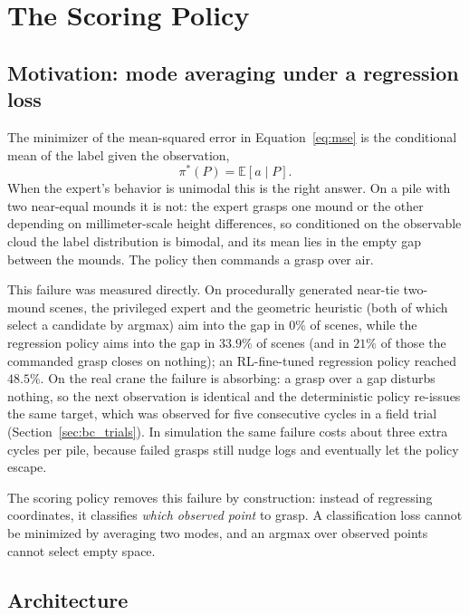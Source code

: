 \section{The Scoring Policy}
\label{sec:bc_scoring}

\subsection{Motivation: mode averaging under a regression loss}
\label{sec:bc_mode_avg}

The minimizer of the mean-squared error in Equation~\eqref{eq:mse} is the
conditional mean of the label given the observation,
\begin{equation}
  \pi^*(P) = \mathbb{E}\left[ a \mid P \right].
\end{equation}
When the expert's behavior is unimodal this is the right answer. On a pile
with two near-equal mounds it is not: the expert grasps one mound or the
other depending on millimeter-scale height differences, so conditioned on the
observable cloud the label distribution is bimodal, and its mean lies in the
empty gap between the mounds. The policy then commands a grasp over air.

This failure was measured directly. On procedurally generated near-tie
two-mound scenes, the privileged expert and the geometric heuristic (both of
which select a candidate by argmax) aim into the gap in $0\%$ of scenes,
while the regression policy aims into the gap in $33.9\%$ of scenes (and in
$21\%$ of those the commanded grasp closes on nothing); an RL-fine-tuned
regression policy reached $48.5\%$. On the real crane the failure is
absorbing: a grasp over a gap disturbs nothing, so the next observation is
identical and the deterministic policy re-issues the same target, which was
observed for five consecutive cycles in a field trial
(Section~\ref{sec:bc_trials}). In simulation the same
failure costs about three extra cycles per pile, because failed grasps still
nudge logs and eventually let the policy escape.

The scoring policy removes this failure by construction: instead of
regressing coordinates, it classifies \emph{which observed point} to grasp.
A classification loss cannot be minimized by averaging two modes, and an
argmax over observed points cannot select empty space.

\subsection{Architecture}


